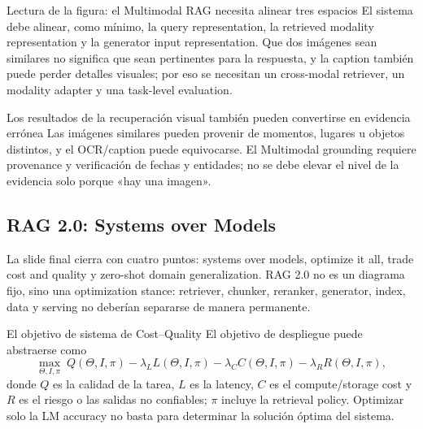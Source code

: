 \begin{knowledgebox}{Lectura de la figura: el Multimodal RAG necesita alinear tres espacios}
El sistema debe alinear, como mínimo, la query representation, la retrieved modality representation y la generator input representation. Que dos imágenes sean similares no significa que sean pertinentes para la respuesta, y la caption también puede perder detalles visuales; por eso se necesitan un cross-modal retriever, un modality adapter y una task-level evaluation.
\end{knowledgebox}

\begin{warningbox}{Los resultados de la recuperación visual también pueden convertirse en evidencia errónea}
Las imágenes similares pueden provenir de momentos, lugares u objetos distintos, y el OCR/caption puede equivocarse. El Multimodal grounding requiere provenance y verificación de fechas y entidades; no se debe elevar el nivel de la evidencia solo porque «hay una imagen».
\end{warningbox}


\subsection{RAG 2.0: Systems over Models}

La slide final cierra con cuatro puntos: systems over models, optimize it all, trade cost and quality y zero-shot domain generalization. RAG 2.0 no es un diagrama fijo, sino una optimization stance: retriever, chunker, reranker, generator, index, data y serving no deberían separarse de manera permanente.


\begin{importantbox}{El objetivo de sistema de Cost--Quality}
El objetivo de despliegue puede abstraerse como
\[
\max_{\Theta,I,\pi}\;
Q(\Theta,I,\pi)
-\lambda_L L(\Theta,I,\pi)
-\lambda_C C(\Theta,I,\pi)
-\lambda_R R(\Theta,I,\pi),
\]
donde $Q$ es la calidad de la tarea, $L$ es la latency, $C$ es el compute/storage cost y $R$ es el riesgo o las salidas no confiables; $\pi$ incluye la retrieval policy. Optimizar solo la LM accuracy no basta para determinar la solución óptima del sistema.
\end{importantbox}

